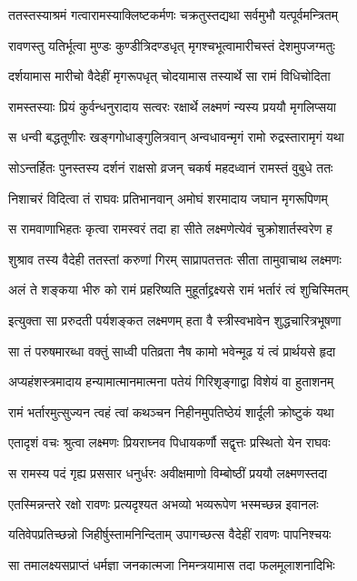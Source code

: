 \twolineshloka
{ततस्तस्याश्रमं गत्वारामस्याक्लिष्टकर्मणः}
{चक्रतुस्तद्यथा सर्वमुभौ यत्पूर्वमन्त्रितम्}


\twolineshloka
{रावणस्तु यतिर्भूत्वा मुण्डः कुण्डीत्रिदण्डधृत्}
{मृगश्चभूत्वामारीचस्तं देशमुपजग्मतुः}


\twolineshloka
{दर्शयामास मारीचो वैदेहीं मृगरूपधृत्}
{चोदयामास तस्यार्थे सा रामं विधिचोदिता}


\twolineshloka
{रामस्तस्याः प्रियं कुर्वन्धनुरादाय सत्वरः}
{रक्षार्थे लक्ष्मणं न्यस्य प्रययौ मृगलिप्सया}


\twolineshloka
{स धन्वी बद्धतूणीरः खङ्गगोधाङ्गुलित्रवान्}
{अन्वधावन्मृगं रामो रुद्रस्तारामृगं यथा}


\twolineshloka
{सोऽन्तर्हितः पुनस्तस्य दर्शनं राक्षसो व्रजन्}
{चकर्ष महदध्वानं रामस्तं वुबुधे ततः}


\twolineshloka
{निशाचरं विदित्वा तं राघवः प्रतिभानवान्}
{अमोघं शरमादाय जघान मृगरूपिणम्}


\twolineshloka
{स रामवाणाभिहतः कृत्वा रामस्वरं तदा}
{हा सीते लक्ष्मणेत्येवं चुक्रोशार्तस्वरेण ह}


\twolineshloka
{शुश्राव तस्य वैदेही ततस्तां करुणां गिरम्}
{साप्रापतत्ततः सीता तामुवाचाथ लक्ष्मणः}


\twolineshloka
{अलं ते शङ्कया भीरु को रामं प्रहरिष्यति}
{मुहूर्ताद्द्रक्ष्यसे रामं भर्तारं त्वं शुचिस्मितम्}


\twolineshloka
{इत्युक्ता सा प्ररुदती पर्यशङ्कत लक्ष्मणम्}
{हता वै स्त्रीस्वभावेन शुद्धचारित्रभूषणा}


\twolineshloka
{सा तं परुषमारब्धा वक्तुं साध्वी पतिव्रता}
{नैष कामो भवेन्मूढ यं त्वं प्रार्थयसे हृदा}


\twolineshloka
{अप्यहंशस्त्रमादाय हन्यामात्मानमात्मना}
{पतेयं गिरिशृङ्गाद्वा विशेयं वा हुताशनम्}


\twolineshloka
{रामं भर्तारमुत्सुज्यन त्वहं त्वां कथञ्चन}
{निहीनमुपतिष्ठेयं शार्दूली क्रोष्टुकं यथा}


\twolineshloka
{एतादृशं वचः श्रुत्वा लक्ष्मणः प्रियराघ्नव}
{पिधायकर्णौ सद्वृत्तः प्रस्थितो येन राघवः}


\twolineshloka
{स रामस्य पदं गृह्य प्रससार धनुर्धरः}
{अवीक्षमाणो विम्बोष्ठीं प्रययौ लक्ष्मणस्तदा}


\twolineshloka
{एतस्मिन्नन्तरे रक्षो रावणः प्रत्यदृश्यत}
{अभव्यो भव्यरूपेण भस्मच्छन्न इवानलः}


\twolineshloka
{यतिवेपप्रतिच्छन्नो जिहीर्षुस्तामनिन्दिताम्}
{उपागच्छत्स वैदेहीं रावणः पापनिश्चयः}


\twolineshloka
{सा तमालक्ष्यसप्राप्तं धर्मज्ञा जनकात्मजा}
{निमन्त्रयामास तदा फलमूलाशनादिभिः}


